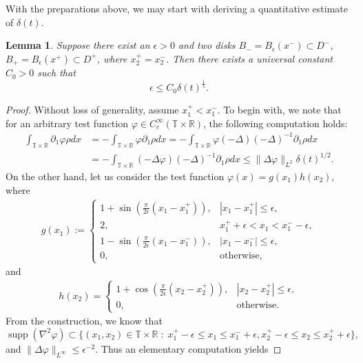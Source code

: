 \documentclass[11pt]{article}
\numberwithin{equation}{section}
\newtheorem{lem}[thm]{Lemma}
\newcommand{\eps}{\epsilon}
\newcommand{\R}{\mathbb{R}}
\newcommand{\T}{\mathbb{T}}
\newcommand{\p}{\partial}
\DeclareMathOperator{\supp}{supp}
\begin{document}
With the preparations above, we may start with deriving a quantitative estimate of $\delta(t)$.
\begin{lem}\label{lem:h-2}
    Suppose there exist an $\eps > 0$ and two disks $B_- = B_\epsilon (x^-) \subset D^-$, $B_+ = B_\eps (x^+) \subset D^+$, where $x_2^+ = x_2^-$. Then there exists a universal constant $C_0 > 0$ such that
    \begin{equation}
        \label{est:radiusbd}
        \eps \le C_0\delta(t)^{\frac15}.
    \end{equation}
\end{lem}
\begin{proof}
    Without loss of generality, assume $x_1^+ < x_1^-$. To begin with, we note that for an arbitrary test function $\varphi \in C^\infty_c (\T \times \R)$, the following computation holds:
    \begin{equation}\label{radbdaux1}
    \begin{split}
        \int_{\T \times \R} \p_1 \varphi \rho dx &= -\int_{\T \times \R} \varphi \p_1\rho dx = -\int_{\T \times \R} \varphi (-\Delta)(-\Delta)^{-1}\p_1 \rho dx\\
        &= -\int_{\T \times \R} (-\Delta \varphi)(-\Delta)^{-1}\p_1 \rho dx \le \|\Delta \varphi\|_{L^2}\delta(t)^{1/2}.
        \end{split}
    \end{equation}
    On the other hand, let us consider the test function $\varphi(x) = g(x_1)h(x_2)$, where
    \begin{align*}
    g(x_1) :=\begin{cases}
        1+ \sin\left(\frac{\pi}{2\eps}(x_1 - x_1^+)\right),& |x_1 - x_1^+| \le \eps,\\
        2,& x_1^+ + \eps < x_1 < x_1^- - \eps,\\
        1 - \sin\left(\frac{\pi}{2\eps}(x_1 - x_1^-)\right),& |x_1 - x_1^-| \le \eps,\\
        0,& \text{otherwise},
    \end{cases}
    \end{align*}
    and
    \begin{align*}
    h(x_2) = \begin{cases}
    1 + \cos\left(\frac{\pi}{2\eps}(x_2 - x_2^+)\right),& |x_2 - x_2^+| \le \eps,\\
    0,& \text{otherwise}.
    \end{cases}
    \end{align*}
    From the construction, we know that $$\supp(\nabla^2\varphi) \subset \{(x_1,x_2 )\in \T\times \R\;:\; x_1^+ - \eps\le x_1 \le x_1^- + \eps, x_2^+ - \eps \le x_2 \le x_2^+ +\eps\},$$ and $\|\Delta \varphi\|_{L^\infty} \le \eps^{-2}$. Thus an elementary computation yields

\end{proof}
\end{document}
